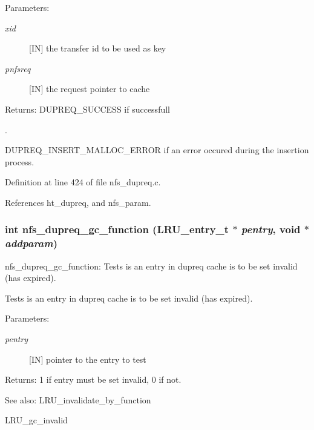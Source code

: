 \begin{Desc}
\item[Parameters:]
\begin{description}
\item[{\em xid}][IN] the transfer id to be used as key \item[{\em pnfsreq}][IN] the request pointer to cache\end{description}
\end{Desc}
\begin{Desc}
\item[Returns:]DUPREQ\_\-SUCCESS if successfull\par
. 

DUPREQ\_\-INSERT\_\-MALLOC\_\-ERROR if an error occured during the insertion process. \end{Desc}


Definition at line 424 of file nfs\_\-dupreq.c.

References ht\_\-dupreq, and nfs\_\-param.
\subsubsection{\setlength{\rightskip}{0pt plus 5cm}int nfs\_\-dupreq\_\-gc\_\-function (LRU\_\-entry\_\-t $\ast$ {\em pentry}, void $\ast$ {\em addparam})}\label{nfs__dupreq_8c_a17}


nfs\_\-dupreq\_\-gc\_\-function: Tests is an entry in dupreq cache is to be set invalid (has expired).

Tests is an entry in dupreq cache is to be set invalid (has expired).

\begin{Desc}
\item[Parameters:]
\begin{description}
\item[{\em pentry}][IN] pointer to the entry to test\end{description}
\end{Desc}
\begin{Desc}
\item[Returns:]1 if entry must be set invalid, 0 if not.\end{Desc}
\begin{Desc}
\item[See also:]LRU\_\-invalidate\_\-by\_\-function 

LRU\_\-gc\_\-invalid \end{Desc}


